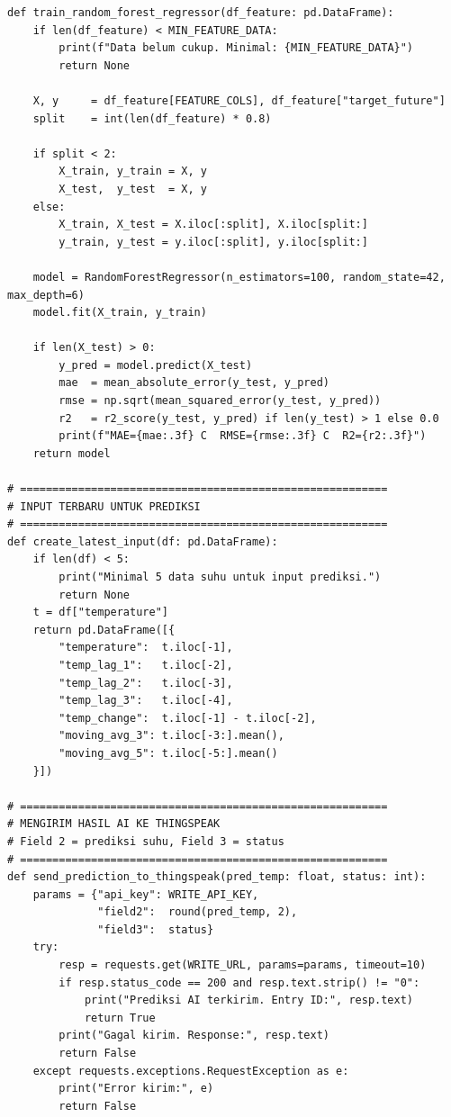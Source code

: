 \begin{lstlisting}[style=pythonstyle,
    caption={Program Python AI Random Forest Regressor untuk Prediksi Suhu 1 Menit},
    label={lst:python}]
def train_random_forest_regressor(df_feature: pd.DataFrame):
    if len(df_feature) < MIN_FEATURE_DATA:
        print(f"Data belum cukup. Minimal: {MIN_FEATURE_DATA}")
        return None

    X, y     = df_feature[FEATURE_COLS], df_feature["target_future"]
    split    = int(len(df_feature) * 0.8)

    if split < 2:
        X_train, y_train = X, y
        X_test,  y_test  = X, y
    else:
        X_train, X_test = X.iloc[:split], X.iloc[split:]
        y_train, y_test = y.iloc[:split], y.iloc[split:]

    model = RandomForestRegressor(n_estimators=100, random_state=42, max_depth=6)
    model.fit(X_train, y_train)

    if len(X_test) > 0:
        y_pred = model.predict(X_test)
        mae  = mean_absolute_error(y_test, y_pred)
        rmse = np.sqrt(mean_squared_error(y_test, y_pred))
        r2   = r2_score(y_test, y_pred) if len(y_test) > 1 else 0.0
        print(f"MAE={mae:.3f} C  RMSE={rmse:.3f} C  R2={r2:.3f}")
    return model

# =========================================================
# INPUT TERBARU UNTUK PREDIKSI
# =========================================================
def create_latest_input(df: pd.DataFrame):
    if len(df) < 5:
        print("Minimal 5 data suhu untuk input prediksi.")
        return None
    t = df["temperature"]
    return pd.DataFrame([{
        "temperature":  t.iloc[-1],
        "temp_lag_1":   t.iloc[-2],
        "temp_lag_2":   t.iloc[-3],
        "temp_lag_3":   t.iloc[-4],
        "temp_change":  t.iloc[-1] - t.iloc[-2],
        "moving_avg_3": t.iloc[-3:].mean(),
        "moving_avg_5": t.iloc[-5:].mean()
    }])

# =========================================================
# MENGIRIM HASIL AI KE THINGSPEAK
# Field 2 = prediksi suhu, Field 3 = status
# =========================================================
def send_prediction_to_thingspeak(pred_temp: float, status: int):
    params = {"api_key": WRITE_API_KEY,
              "field2":  round(pred_temp, 2),
              "field3":  status}
    try:
        resp = requests.get(WRITE_URL, params=params, timeout=10)
        if resp.status_code == 200 and resp.text.strip() != "0":
            print("Prediksi AI terkirim. Entry ID:", resp.text)
            return True
        print("Gagal kirim. Response:", resp.text)
        return False
    except requests.exceptions.RequestException as e:
        print("Error kirim:", e)
        return False


\end{lstlisting}
